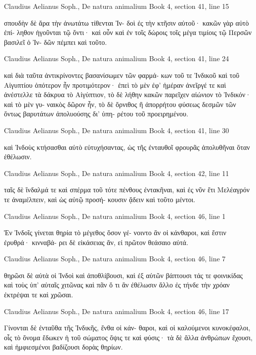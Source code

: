 \documentclass[12pt,letterpaper,twoside,final]{memoir}
\begin{document}
\begin{greek}
Claudius Aelianus Soph., De natura animalium 
Book 4, section 41, line 15

      σπουδὴν δὲ ἄρα τὴν ἀνωτάτω τίθενται Ἰν-
δοὶ ἐς τὴν κτῆσιν αὐτοῦ· κακῶν γὰρ αὐτὸ ἐπί-
ληθον ἡγοῦνται τῷ ὄντι· καὶ οὖν καὶ ἐν τοῖς 
δώροις τοῖς μέγα τιμίοις τῷ Περσῶν βασιλεῖ ὁ Ἰν-
δῶν πέμπει καὶ τοῦτο. 



Claudius Aelianus Soph., De natura animalium 
Book 4, section 41, line 24

                                                         καὶ 
διὰ ταῦτα ἀντικρίνοντες βασανίσωμεν τῶν φαρμά-
κων τοῦ τε Ἰνδικοῦ καὶ τοῦ Αἰγυπτίου ὁπότερον ἦν 
προτιμότερον· ἐπεὶ τὸ μὲν ἐφ' ἡμέραν ἀνεῖργέ τε 
καὶ ἀνέστελλε τὰ δάκρυα τὸ Αἰγύπτιον, τὸ δὲ λήθην 
κακῶν παρεῖχεν αἰώνιον τὸ Ἰνδικόν· καὶ τὸ μὲν γυ-
ναικὸς δῶρον ἦν, τὸ δὲ ὄρνιθος ἢ ἀπορρήτου φύσεως 
δεσμῶν τῶν ὄντως βαρυτάτων ἀπολυούσης δι' ὑπη-
ρέτου τοῦ προειρημένου. 



Claudius Aelianus Soph., De natura animalium 
Book 4, section 41, line 30

                           καὶ Ἰνδοὺς κτήσασθαι αὐτὸ 
εὐτυχήσαντας, ὡς τῆς ἐνταυθοῖ φρουρᾶς ἀπολυθῆναι 
ὅταν ἐθέλωσιν. 



Claudius Aelianus Soph., De natura animalium 
Book 4, section 42, line 11

                                        ταῖς δὲ ἴνδαλμά τε 
καὶ σπέρμα τοῦ τότε πένθους ἐντακῆναι, καὶ ἐς νῦν 
ἔτι Μελέαγρόν τε ἀναμέλπειν, καὶ ὡς αὐτῷ προσή-
κουσιν ᾄδειν καὶ τοῦτο μέντοι. 



Claudius Aelianus Soph., De natura animalium 
Book 4, section 46, line 1

Ἐν Ἰνδοῖς γίνεται θηρία τὸ μέγεθος ὅσον γέ-
νοιντο ἂν οἱ κάνθαροι, καὶ ἔστιν ἐρυθρά· κινναβά-
ρει δὲ εἰκάσειας ἄν, εἰ πρῶτον θεάσαιο αὐτά. 



Claudius Aelianus Soph., De natura animalium 
Book 4, section 46, line 7

        θηρῶσι δὲ αὐτὰ οἱ Ἰνδοὶ καὶ ἀποθλίβουσι, 
καὶ ἐξ αὐτῶν βάπτουσι τάς τε φοινικίδας καὶ τοὺς 
ὑπ' αὐταῖς χιτῶνας καὶ πᾶν ὅ τι ἂν ἐθέλωσιν ἄλλο 
ἐς τήνδε τὴν χρόαν ἐκτρέψαι τε καὶ χρῶσαι. 



Claudius Aelianus Soph., De natura animalium 
Book 4, section 46, line 17

Γίνονται δὲ ἐνταῦθα τῆς Ἰνδικῆς, ἔνθα οἱ κάν-
θαροι, καὶ οἱ καλούμενοι κυνοκέφαλοι, οἷς τὸ ὄνομα 
ἔδωκεν ἡ τοῦ σώματος ὄψις τε καὶ φύσις· τὰ δὲ ἄλλα 
ἀνθρώπων ἔχουσι, καὶ ἠμφιεσμένοι βαδίζουσι δορὰς 
θηρίων. 




\end{greek}
\end{document}
